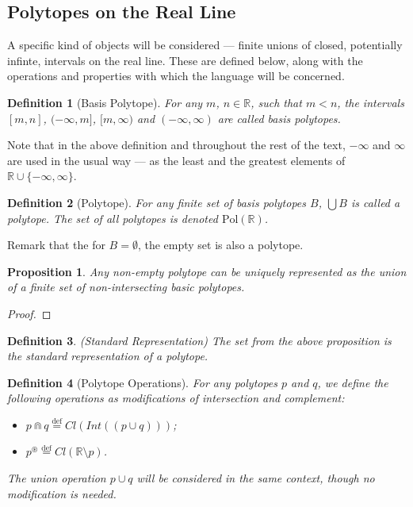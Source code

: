 \documentclass{article}
\newtheorem*{definition}{Definition}
\newtheorem*{proposition}{Proposition}
\newcommand{\R}{\mathbb{R}}
\newcommand{\bcup}{\cup}
\newcommand{\bcap}{\Cap}
\newcommand{\bstar}{^\circledast}
\newcommand{\Pol}{\text{Pol}}
\newcommand{\eqdef}{\stackrel{\text{def}}{=}}
\begin{document}
\subsection{Polytopes on the Real Line}

A specific kind of objects will be considered --- finite unions of closed, potentially infinte, intervals on the real line. These are defined below, along with the operations and properties with which the language will be concerned.

\begin{definition}[Basis Polytope]
For any $m$, $n \in \mathbb{R}$, such that $m < n$, the intervals $[m, n]$, $(-\infty, m]$, $[m, \infty)$ and $(-\infty, \infty)$ are called \emph{basis polytopes}.
\end{definition}

Note that in the above definition and throughout the rest of the text, $-\infty$ and $\infty$ are used in the usual way --- as the least and the greatest elements of $\R \cup \{-\infty, \infty\}$.

\begin{definition}[Polytope]
For any finite set of basis polytopes $B$, $\bigcup B$ is called a \emph{polytope}. The set of all polytopes is denoted $\Pol(\R)$.
\end{definition}

Remark that the for $B = \emptyset$, the empty set is also a polytope.

\begin{proposition}
Any non-empty polytope can be uniquely represented as the union of a finite set of non-intersecting basic polytopes.
\end{proposition}
\begin{proof}
\end{proof}

\begin{definition}(Standard Representation)
The set from the above proposition is the \emph{standard representation} of a polytope.
\end{definition}

\begin{definition}[Polytope Operations]
For any polytopes $p$ and $q$, we define the following operations as modifications of intersection and complement:
\begin{itemize}
  \item $p \bcap q \eqdef Cl(Int((p \cup q)))$;
  \item $p \bstar \eqdef Cl(\R \setminus p) $.
\end{itemize}
The union operation $p \bcup q$ will be considered in the same context, though no modification is needed.
\end{definition}
\end{document}
